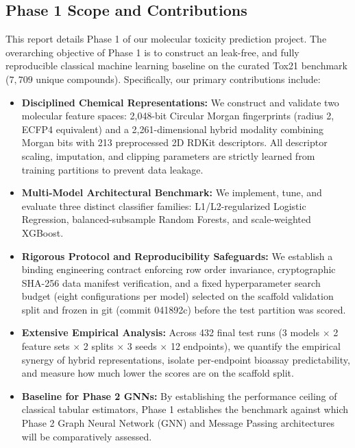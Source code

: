 \subsection{Phase 1 Scope and Contributions}
This report details Phase 1 of our molecular toxicity prediction project. The overarching objective of Phase 1 is to construct an leak-free, and fully reproducible classical machine learning baseline on the curated Tox21 benchmark ($7{,}709$ unique compounds). Specifically, our primary contributions include:
\begin{itemize}
    \item \textbf{Disciplined Chemical Representations:} We construct and validate two molecular feature spaces: 2,048-bit Circular Morgan fingerprints (radius 2, ECFP4 equivalent) and a 2,261-dimensional hybrid modality combining Morgan bits with 213 preprocessed 2D RDKit descriptors. All descriptor scaling, imputation, and clipping parameters are strictly learned from training partitions to prevent data leakage.
    \item \textbf{Multi-Model Architectural Benchmark:} We implement, tune, and evaluate three distinct classifier families: L1/L2-regularized Logistic Regression, balanced-subsample Random Forests, and scale-weighted XGBoost.
    \item \textbf{Rigorous Protocol and Reproducibility Safeguards:} We establish a binding engineering contract enforcing row order invariance, cryptographic SHA-256 data manifest verification, and a fixed hyperparameter search budget (eight configurations per model) selected on the scaffold validation split and frozen in git (commit 041892c) before the test partition was scored.
    \item \textbf{Extensive Empirical Analysis:} Across 432 final test runs (3 models $\times$ 2 feature sets $\times$ 2 splits $\times$ 3 seeds $\times$ 12 endpoints), we quantify the empirical synergy of hybrid representations, isolate per-endpoint bioassay predictability, and measure how much lower the scores are on the scaffold split.
    \item \textbf{Baseline for Phase 2 GNNs:} By establishing the performance ceiling of classical tabular estimators, Phase 1 establishes the benchmark against which Phase 2 Graph Neural Network (GNN) and Message Passing architectures will be comparatively assessed.
\end{itemize}

